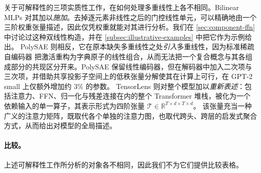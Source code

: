 \documentclass[11pt]{article}
\newcommand{\R}{\mathbb{R}}
\newcommand{\ten}[1]{\mathcal{#1}}
\begin{document}
关于可解释性的三项实质性工作，在如何处理多重线性上各不相同。Bilinear MLPs \cite{pearce2025bilinearmlp} 对其加以\emph{施加}。去掉逐元素非线性之后的门控线性单元，可以精确地由一个三阶权重张量描述，因此仅凭权重就能对其进行分析。我们在 \cref{sec:component-ffn} 中讨论过这种双线性构造，并在 \cref{subsec:illustrative-examples} 中把它作为示例给出。
PolySAE \cite{koromilas2026polysae} 则相反，它在原本缺失多重线性之处\emph{引入}多重线性，因为标准稀疏自编码器 \cite{cunningham2023sae} 把激活重构为字典原子的线性组合，从而无法把一个复合概念与其各组成部分的共现区分开来。PolySAE 保留线性编码器，但在解码器中加入二次项与三次项，并借助共享投影子空间上的低秩张量分解使其在计算上可行，在 GPT-2 small 上仅额外增加约 $3\%$ 的参数。
TensorLens \cite{atad2026tensorlens} 则对整个模型加以\emph{重新表述}：包括注意力、FFN、归一化与残差连接在内的整个 Transformer 堆栈，被化为一个依赖输入的单一算子，其表示形式为四阶张量 $\ten{T} \in \R^{T \times d \times T \times d}$。
该张量充当一种广义的注意力矩阵，既取代各个单独的注意力图，也取代跨头、跨层的启发式聚合方式，从而给出对模型的全局描述。

\paragraph{比较。} 
上述可解释性工作所分析的对象各不相同，因此我们不为它们提供比较表格。



\end{document}
